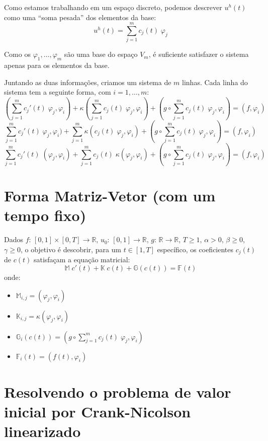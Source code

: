 \documentclass[a4paper]{article}
\newcommand{\typ}{:\,}
\newcommand{\vphi}{\varphi}
\begin{document}
Como estamos trabalhando em um espaço discreto,
podemos descrever \(u^h(t)\)
como uma ``soma pesada'' dos elementos da base:
\[
    u^h(t) = \sum_{j=1}^m{ c_j(t) \; \vphi_j }
\]

Como os \(\vphi_1, \dots, \vphi_m\)
são uma base do espaço \(V_m\),
é suficiente satisfazer o sistema
apenas para os elementos da base.

Juntando as duas informações,
criamos um sistema de \(m\) linhas.
Cada linha do sistema tem a seguinte forma,
com \(i = 1, \dots, m\):
\[
    (\sum_{j=1}^m{ {c_j}'(t) \; \vphi_j }, \vphi_i)
    + \kappa(\sum_{j=1}^m{ {c_j}(t) \; \vphi_j }, \vphi_i)
    + (g \circ \sum_{j=1}^m{ {c_j}(t) \; \vphi_j }, \vphi_i)
    = (f, \vphi_i)
\] \[
    \sum_{j=1}^m{ {c_j}'(t) \; \vphi_j, \vphi_i) }
    + \sum_{j=1}^m{ \kappa({c_j}(t) \; \vphi_j, \vphi_i) }
    + (g \circ \sum_{j=1}^m{ {c_j}(t) \; \vphi_j }, \vphi_i)
    = (f, \vphi_i)
\] \[
    \sum_{j=1}^m{ {c_j}'(t) \; (\vphi_j, \vphi_i) }
    + \sum_{j=1}^m{ {c_j}(t) \; \kappa(\vphi_j, \vphi_i) }
    + (g \circ \sum_{j=1}^m{ {c_j}(t) \; \vphi_j }, \vphi_i)
    = (f, \vphi_i)
\]

\section{Forma Matriz-Vetor (com um tempo fixo)}

Dados
\(f \typ [0, 1] \times [0, T] \to \mathbb{R}\),
\(u_0 \typ [0, 1] \to \mathbb{R}\),
\(g \typ \mathbb{R} \to \mathbb{R}\),
\(T \ge 1\),
\(\alpha > 0\),
\(\beta \ge 0\),
\(\gamma \ge 0\),
o objetivo é descobrir,
para um \(t \in [1, T]\) específico,
os coeficientes \(c_j(t)\)
de \(c(t)\)
satisfaçam a equação matricial:
\[
    \mathbb{M} \; c'(t) + \mathbb{K} \; c(t) + \mathbb{G}(c(t)) = \mathbb{F}(t)
\]
onde:
\begin{itemize}
\item \(
    \mathbb{M}_{i, j} = (\vphi_j, \vphi_i)
\)
\item \(
    \mathbb{K}_{i, j} = \kappa(\vphi_j, \vphi_i)
\)
\item \(
    \mathbb{G}_{i}(c(t)) = (g \circ \sum_{j=1}^m{ c_j(t) \; \vphi_j }, \vphi_i)
\)
\item \(
    \mathbb{F}_i(t) = (f(t), \vphi_i)
\)
\end{itemize}

\section{Resolvendo o problema de valor inicial por Crank-Nicolson linearizado}
\end{document}
